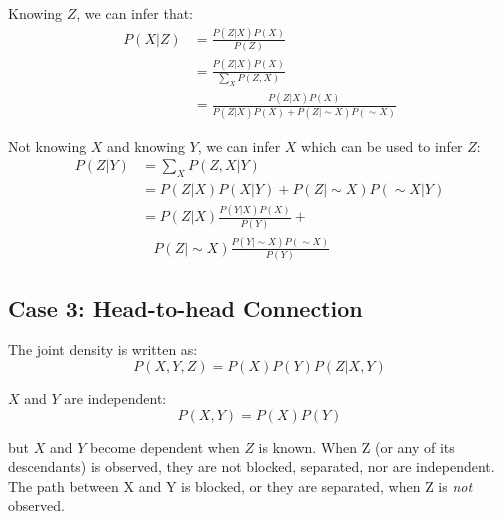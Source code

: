 \begin{multicols*}{2}
\noindent Knowing $Z$, we can infer that:
\begin{equation*}
\begin{split}
    P(X|Z) &= \frac{P(Z|X)P(X)}{P(Z)} \\
    &= \frac{P(Z|X)P(X)}{\sum_X P(Z,X)} \\
    &= \frac{P(Z|X)P(X)}{P(Z|X)P(X) +P(Z|\sim X)P(\sim X) }
\end{split}
\end{equation*}

\noindent Not knowing $X$ and knowing $Y$, we can infer $X$ which can be used to infer $Z$:
\begin{equation*}
\begin{split}
    P(Z|Y) &= \sum_X P(Z,X|Y)\\
    &= P(Z|X)P(X|Y) + P(Z|\sim X)P(\sim X|Y) \\
    &= P(Z|X) \frac{P(Y|X)P(X)}{P(Y)} + \\
    & \ \ \ \ P(Z|\sim X) \frac{P(Y| \sim X) P(\sim X)}{P(Y)}
\end{split}
\end{equation*}

\subsection{Case 3: Head-to-head Connection}
\begin{center}
\end{center}

\noindent The joint density is written as:
$$P(X,Y,Z) = P(X) P(Y) P(Z|X,Y)$$

\noindent $X$ and $Y$ are independent:
$$P(X,Y)=P(X)P(Y)$$

\noindent but $X$ and $Y$ become dependent when $Z$ is known. When Z (or any of its descendants) is observed, they are not blocked, separated, nor are independent. The path between X and Y is blocked, or they are separated, when Z is \textit{not} observed.


\end{multicols*}
